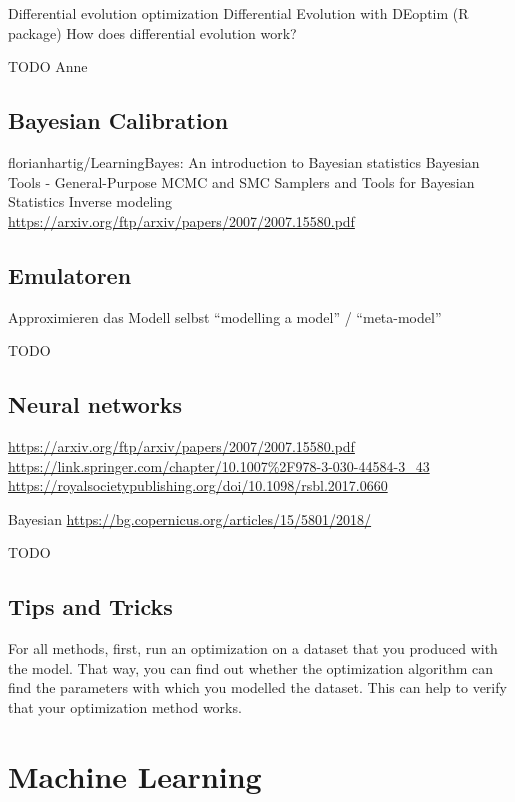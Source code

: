 \documentclass[
]{book}
\begin{document}
Differential evolution optimization Differential Evolution with DEoptim
(R package) How does differential evolution work?

TODO Anne

\subsection{Bayesian Calibration}\label{bayesian-calibration}

florianhartig/LearningBayes: An introduction to Bayesian statistics
Bayesian Tools - General-Purpose MCMC and SMC Samplers and Tools for
Bayesian Statistics Inverse modeling
\url{https://arxiv.org/ftp/arxiv/papers/2007/2007.15580.pdf}

\subsection{Emulatoren}\label{emulatoren}

Approximieren das Modell selbst ``modelling a model'' / ``meta-model''

TODO

\subsection{Neural networks}\label{neural-networks}

\url{https://arxiv.org/ftp/arxiv/papers/2007/2007.15580.pdf}
\url{https://link.springer.com/chapter/10.1007\%2F978-3-030-44584-3_43}
\url{https://royalsocietypublishing.org/doi/10.1098/rsbl.2017.0660}

Bayesian \url{https://bg.copernicus.org/articles/15/5801/2018/}

TODO

\subsection{Tips and Tricks}\label{tips-and-tricks}

For all methods, first, run an optimization on a dataset that you
produced with the model. That way, you can find out whether the
optimization algorithm can find the parameters with which you modelled
the dataset. This can help to verify that your optimization method
works.

\section{Machine Learning}\label{machine-learning}
\end{document}
